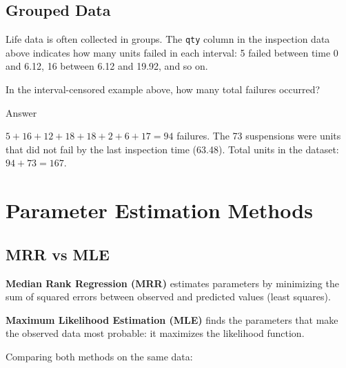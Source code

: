 \documentclass[
  letterpaper,
  DIV=11,
  numbers=noendperiod]{scrreprt}
\begin{document}
\subsection{Grouped Data}\label{grouped-data}

Life data is often collected in groups. The \texttt{qty} column in the
inspection data above indicates how many units failed in each interval:
5 failed between time 0 and 6.12, 16 between 6.12 and 19.92, and so on.

\begin{tcolorbox}[enhanced jigsaw, arc=.35mm, bottomrule=.15mm, bottomtitle=1mm, breakable, colback=white, colbacktitle=quarto-callout-tip-color!10!white, colframe=quarto-callout-tip-color-frame, coltitle=black, left=2mm, leftrule=.75mm, opacityback=0, opacitybacktitle=0.6, rightrule=.15mm, title=\textcolor{quarto-callout-tip-color}{\faLightbulb}\hspace{0.5em}{Review}, titlerule=0mm, toprule=.15mm, toptitle=1mm]

In the interval-censored example above, how many total failures
occurred?

Answer

\(5 + 16 + 12 + 18 + 18 + 2 + 6 + 17 = 94\) failures. The 73 suspensions
were units that did not fail by the last inspection time (63.48). Total
units in the dataset: \(94 + 73 = 167\).

\end{tcolorbox}

\section{Parameter Estimation
Methods}\label{parameter-estimation-methods}

\subsection{MRR vs MLE}\label{mrr-vs-mle}

\textbf{Median Rank Regression (MRR)} estimates parameters by minimizing
the sum of squared errors between observed and predicted values (least
squares).

\textbf{Maximum Likelihood Estimation (MLE)} finds the parameters that
make the observed data most probable: it maximizes the likelihood
function.

Comparing both methods on the same data:
\end{document}
